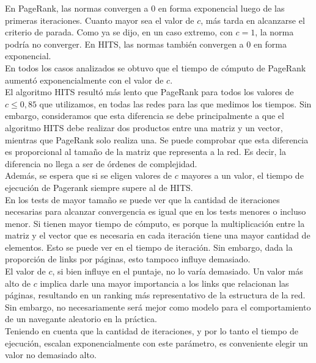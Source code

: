 \documentclass[a4paper]{article}
\begin{document}
En PageRank, las normas convergen a 0 en forma exponencial luego de las primeras iteraciones. Cuanto mayor sea el valor de $c$, más tarda en alcanzarse el criterio de parada. Como ya se dijo, en un caso extremo, con $c=1$, la norma podría no converger. En HITS, las normas también convergen a 0 en forma exponencial.\\

En todos los casos analizados se obtuvo que el tiempo de cómputo de PageRank aumentó exponencialmente con el valor de $c$.\\

El algoritmo HITS resultó más lento que PageRank para todos los valores de $c \leq 0,85$ que utilizamos, en todas las redes para las que medimos los tiempos. Sin embargo, consideramos que esta diferencia se debe principalmente a que el algoritmo HITS debe realizar dos productos entre una matriz y un vector, mientras que PageRank solo realiza una. Se puede comprobar que esta diferencia es proporcional al tamaño de la matriz que representa a la red. Es decir, la diferencia no llega a ser de órdenes de complejidad.\\

Además, se espera que si se eligen valores de $c$ mayores a un valor, el tiempo de ejecución de Pagerank siempre supere al de HITS.\\

En los tests de mayor tamaño se puede ver que la cantidad de iteraciones necesarias para alcanzar convergencia es igual que en los tests menores o incluso menor. Si tienen mayor tiempo de cómputo, es porque la multiplicación entre la matriz y el vector que es necesaria en cada iteración tiene una mayor cantidad de elementos. Esto se puede ver en el tiempo de iteración. Sin embargo, dada la proporción de links por páginas, esto tampoco influye demasiado.\\

El valor de $c$, si bien influye en el puntaje, no lo varía demasiado. Un valor más alto de $c$ implica darle una mayor importancia a los links que relacionan las páginas, resultando en un ranking más representativo de la estructura de la red. Sin embargo, no necesariamente será mejor como modelo para el comportamiento de un navegante aleatorio en la práctica.\\

Teniendo en cuenta que la cantidad de iteraciones, y por lo tanto el tiempo de ejecución, escalan exponencialmente con este parámetro, es conveniente elegir un valor no demasiado alto. \\
\end{document}
